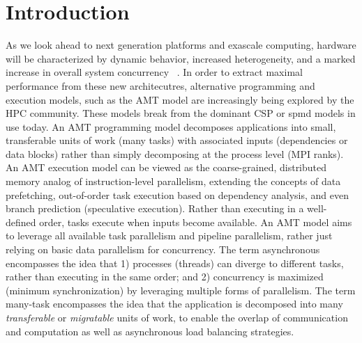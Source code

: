 

\chapter{Introduction}
\label{chap:introduction}
As we look ahead to next generation platforms and exascale computing,  hardware 
will be characterized by dynamic behavior, increased
heterogeneity, and a marked increase in overall system \gls{concurrency}
~\cite{doe_arch, dav_exascale}. 
In order to extract maximal performance from these new architecutres,
alternative programming  and \glspl{execution model}, such as the \gls{AMT
model} are increasingly being explored by the HPC community.  These models break from the dominant
\gls{CSP} or \gls{spmd} models in use today. 
An \gls{AMT} \gls{programming model} decomposes applications into small, transferable units of work (many tasks) with associated inputs (dependencies or data blocks) rather than simply decomposing at the process level (MPI ranks).
An \gls{AMT} \gls{execution model} can be viewed as the coarse-grained, distributed memory analog of instruction-level parallelism, extending the concepts of data prefetching,
out-of-order task execution based on dependency analysis, and even branch prediction (speculative execution). 
Rather than executing in a well-defined order, tasks execute when inputs become available.
An \gls{AMT} model aims to leverage all available \gls{task parallelism} and
\gls{pipeline parallelism}, rather just relying on basic \gls{data
  parallelism} for \gls{concurrency}.
The term asynchronous encompasses the idea that 1) processes (threads) can
  diverge to different tasks, rather than executing in the same order; and 2)
  \gls{concurrency} is maximized (minimum synchronization) by leveraging
  multiple forms of \gls{parallelism}.
	The term many-task encompasses the idea that the application is decomposed
  into many \emph{transferable} or \emph{migratable} units of work, to
  enable the overlap of communication and computation as well as asynchronous load balancing strategies.  


